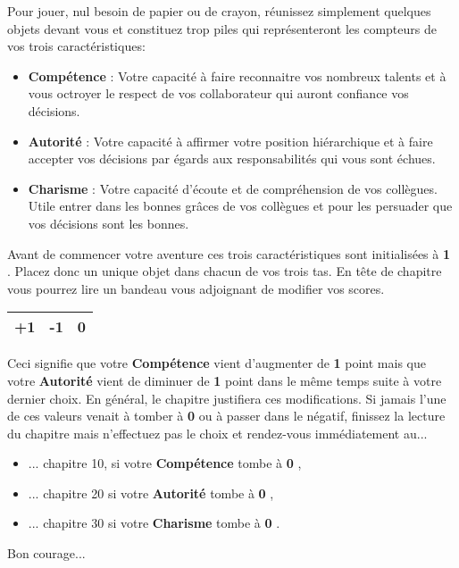 \documentclass[12pt,a4paper,titlepage]{article}
\newcommand{\Competence}{\textbf{Compétence} }
\newcommand{\Autorite}{\textbf{Autorité} }
\newcommand{\Charisme}{\textbf{Charisme} }
\newcommand{\n}[1]{\textbf{#1} }
\newcommand{\update}[3]{
\begin{center}
\begin{tabular}{|c|c|c|}
\hline #1 & #2 & #3 \\ \hline
\end{tabular}
\end{center}
}
\begin{document}
Pour jouer, nul besoin de papier ou de crayon, réunissez simplement quelques objets devant vous et constituez trop piles qui représenteront les compteurs de vos trois caractéristiques:
\begin{itemize}
\item \Competence : Votre capacité à faire reconnaitre vos nombreux talents et à vous octroyer le  respect de vos collaborateur qui auront confiance vos décisions.
\item \Autorite : Votre capacité à affirmer votre position hiérarchique et à faire accepter vos décisions par égards aux responsabilités qui vous sont échues.
\item \Charisme : Votre capacité d'écoute et de compréhension de vos collègues. Utile entrer dans les bonnes grâces de vos collègues et pour les persuader que vos décisions sont les bonnes.
\end{itemize}
Avant de commencer votre aventure ces trois caractéristiques sont initialisées à \n{1}. Placez donc un unique objet dans chacun
de vos trois tas. En tête de chapitre vous pourrez lire un bandeau vous adjoignant de modifier vos scores.
\update{+1}{-1}{0}
Ceci signifie que votre \Competence vient d'augmenter de \n{1} point mais que votre \Autorite vient de diminuer de \n{1} point dans le même temps suite à votre dernier choix. En général, le chapitre justifiera ces modifications.
Si jamais l'une de ces valeurs venait à tomber à \n{0} ou à passer dans le négatif, finissez la lecture du chapitre mais n'effectuez pas le choix et rendez-vous immédiatement au...
\begin{itemize}
\item ... chapitre 10, si votre \Competence tombe à \n{0},
\item ... chapitre 20 si votre \Autorite tombe à \n{0},
\item ... chapitre 30 si votre \Charisme tombe à \n{0}.
\end{itemize}
Bon courage...

\newpage
\end{document}
